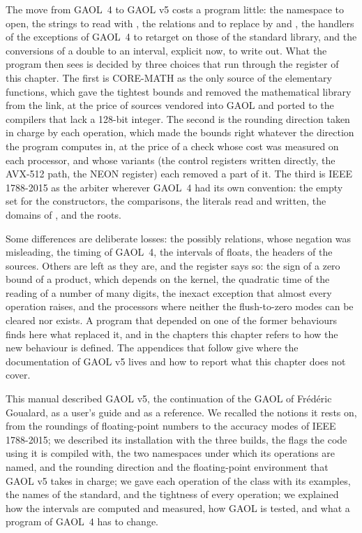 \documentclass[12pt,a4paper,twoside,openright]{book}
\begin{document}
The move from GAOL~4 to GAOL v5 costs a program little: the namespace to
open, the strings to read with , the relations
\code{==} and \code{!=} to replace by  and
, the handlers of the exceptions of GAOL~4 to
retarget on those of the standard library, and the conversions of a double
to an interval, explicit now, to write out. What the program then sees is
decided by three choices that run through the register of this chapter. The
first is CORE-MATH as the only source of the elementary functions, which gave
the tightest bounds and removed the mathematical library from the link, at
the price of sources vendored into GAOL and ported to the compilers that lack
a 128-bit integer. The second is the rounding direction taken in charge by
each operation, which made the bounds right whatever the direction the
program computes in, at the price of a check whose cost was measured on each
processor, and whose variants (the control registers written directly, the
AVX-512 path, the NEON register) each removed a part of it. The third is IEEE
1788-2015 as the arbiter wherever GAOL~4 had its own convention: the empty
set for the constructors, the comparisons, the literals read and written, the
domains of ,  and the roots.

\medskip
Some differences are deliberate losses: the possibly relations, whose
negation was misleading, the timing of GAOL~4, the intervals of floats, the
headers of the sources. Others are left as they are, and the register says
so: the sign of a zero bound of a product, which depends on the kernel, the
quadratic time of the reading of a number of many digits, the inexact exception
that almost every operation raises, and the processors where neither the
flush-to-zero modes can be cleared nor  exists. A
program that depended on one of the former behaviours finds here what
replaced it, and in the chapters this chapter refers to how the new
behaviour is defined. The appendices that follow give where the
documentation of GAOL v5 lives and how to report what this chapter does not
cover.

\label{chap:conclusion}
\pagestyle{CONCLU}
\thispagestyle{plain}

This manual described GAOL v5, the continuation of the GAOL of Fr\'ed\'eric
Goualard, as a user's guide and as a reference. We recalled the notions it
rests on, from the roundings of floating-point numbers to the accuracy modes
of IEEE 1788-2015; we described its installation with the three builds, the
flags the code using it is compiled with, the two namespaces under which its
operations are named, and the rounding direction and the floating-point
environment that GAOL v5 takes in charge; we gave each operation of the class
 with its examples, the names of the standard, and the
tightness of every operation; we explained how the intervals are computed
and measured, how GAOL is tested, and what a program of GAOL~4 has to change.
\end{document}
